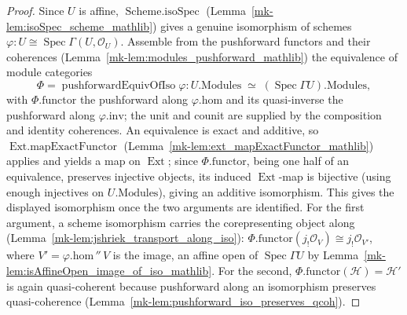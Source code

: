 \begin{proof}
  Since \(U\) is affine, \(\operatorname{Scheme.isoSpec}\) (Lemma~\ref{mk-lem:isoSpec_scheme_mathlib})
  gives a genuine isomorphism of schemes \(\varphi : U \cong \operatorname{Spec}\Gamma(U, \mathcal{O}_U)\).
  Assemble from the pushforward functors and their coherences
  (Lemma~\ref{mk-lem:modules_pushforward_mathlib}) the equivalence of module categories
  \[
    \Phi = \operatorname{pushforwardEquivOfIso}\varphi :
      U.\mathrm{Modules} \;\simeq\; (\operatorname{Spec}\Gamma U).\mathrm{Modules},
  \]
  with \(\Phi.\mathrm{functor}\) the pushforward along \(\varphi.\mathrm{hom}\) and its quasi-inverse the
  pushforward along \(\varphi.\mathrm{inv}\); the unit and counit are supplied by the composition and
  identity coherences. An equivalence is exact and additive, so
  \(\operatorname{Ext.mapExactFunctor}\) (Lemma~\ref{mk-lem:ext_mapExactFunctor_mathlib}) applies and
  yields a map on \(\operatorname{Ext}\); since \(\Phi.\mathrm{functor}\), being one half of an
  equivalence, preserves injective objects, its induced \(\operatorname{Ext}\)-map is bijective
  (using enough injectives on \(U.\mathrm{Modules}\)), giving an additive isomorphism. This gives
  the displayed isomorphism once the two arguments are identified. For the first
  argument, a scheme isomorphism carries the corepresenting object along
  (Lemma~\ref{mk-lem:jshriek_transport_along_iso}): \(\Phi.\mathrm{functor}(j_!\mathcal{O}_V) \cong
  j_!\mathcal{O}_{V'}\), where \(V' = \varphi.\mathrm{hom}\,{''}\,V\) is the image, an affine open of
  \(\operatorname{Spec}\Gamma U\) by Lemma~\ref{mk-lem:isAffineOpen_image_of_iso_mathlib}. For the second,
  \(\Phi.\mathrm{functor}(\mathcal{H}) = \mathcal{H}'\) is again quasi-coherent because pushforward along
  an isomorphism preserves quasi-coherence (Lemma~\ref{mk-lem:pushforward_iso_preserves_qcoh}).
\end{proof}

